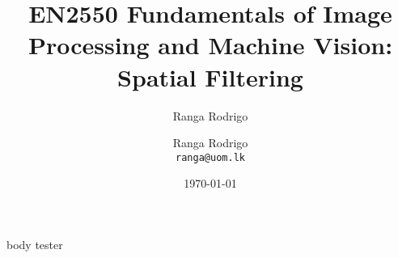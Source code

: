 \documentclass[t, aspectratio=169,xcolor={svgnames}, 10pt, handout]{beamer}
\title{EN2550 Fundamentals of Image Processing and Machine Vision: Spatial Filtering}
\author{Ranga Rodrigo}
\author[]{Ranga Rodrigo\\ \texttt{ranga@uom.lk}}
\institute[]{The University of Moratuwa, Sri Lanka}
\date{\today}
\begin{document}
    \begin{frame}
        \titlepage
    \end{frame}


    {body}
    {tester}
\end{document}
